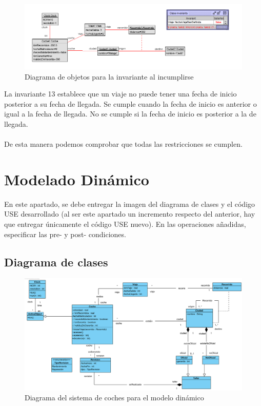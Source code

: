 \documentclass[12pt.a4paper]{article}
\begin{document}
    
 \begin{figure}[H]
     \includegraphics[width=1\linewidth]{Soils/13_v3.png}
     \caption{Diagrama de objetos para la invariante al incumplirse}
     \label{Diagrama del sistema de aviacion}
\end{figure}

La invariante 13 establece que un viaje no puede tener una fecha de inicio posterior a su fecha de llegada. Se cumple cuando la fecha de inicio es anterior o igual a la fecha de llegada. No se cumple si la fecha de inicio es posterior a la de llegada.\\\\
De esta manera podemos comprobar que todas las restricciones se cumplen.

\newpage
\section{Modelado Dinámico}
En este apartado, se debe entregar la imagen del diagrama de clases y el código USE desarrollado (al ser este apartado un incremento respecto del anterior, hay que entregar únicamente el código USE nuevo). En las operaciones añadidas, especificar las pre- y post- condiciones.

\subsection{Diagrama de clases}
\begin{figure}[H]
     \includegraphics[width=1\linewidth]{diagramas/VPP_B.png}
     \caption{Diagrama del sistema de coches para el modelo dinámico}
     \label{Diagrama del sistema de coches}
\end{figure}
\end{document}
